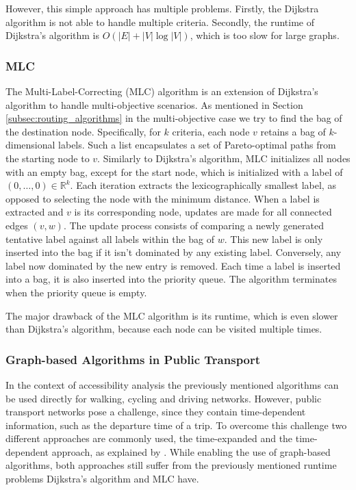 However, this simple approach has multiple problems.
Firstly, the Dijkstra algorithm is not able to handle multiple criteria.
Secondly, the runtime of Dijkstra's algorithm is \( O(|E| + |V| \log |V|) \), which is too slow for large graphs.

\subsubsection{MLC}
\label{subsubsec:mlc}

The Multi-Label-Correcting (MLC)  algorithm is an extension of Dijkstra's algorithm to handle multi-objective scenarios.
As mentioned in Section \ref{subsec:routing_algorithms} in the multi-objective case we try to find the bag of the destination node.
Specifically, for \(k\) criteria, each node \(v\) retains a bag of \(k\)-dimensional labels. Such a list encapsulates a set of Pareto-optimal paths from the starting node to \(v\).
Similarly to Dijkstra's algorithm, MLC initializes all nodes with an empty bag, except for the start node, which is initialized with a label of \( (0, \dots, 0) \in \mathbb{R}^k \).
Each iteration extracts the lexicographically smallest label, as opposed to selecting the node with the minimum distance.
When a label is extracted and \(v\) is its corresponding node, updates are made for all connected edges \( (v, w) \).
The update process consists of comparing a newly generated tentative label against all labels within the bag of \(w\).
This new label is only inserted into the bag if it isn't dominated by any existing label.
Conversely, any label now dominated by the new entry is removed.
Each time a label is inserted into a bag, it is also inserted into the priority queue.
The algorithm terminates when the priority queue is empty.

The major drawback of the MLC algorithm is its runtime, which is even slower than Dijkstra's algorithm, because each node can be visited multiple times.


\subsubsection{Graph-based Algorithms in Public Transport}
\label{subsubsec:graph_based_algorithms_in_public_transport}


In the context of accessibility analysis the previously mentioned algorithms can be used directly for walking, cycling and driving networks.
However, public transport networks pose a challenge, since they contain time-dependent information, such as the departure time of a trip.
To overcome this challenge two different approaches are commonly used, the time-expanded and the time-dependent approach, as explained by \cite{muller-hannemannTimetableInformationModels2007}.
While enabling the use of graph-based algorithms, both approaches still suffer from the previously mentioned runtime problems Dijkstra's algorithm and MLC have.

